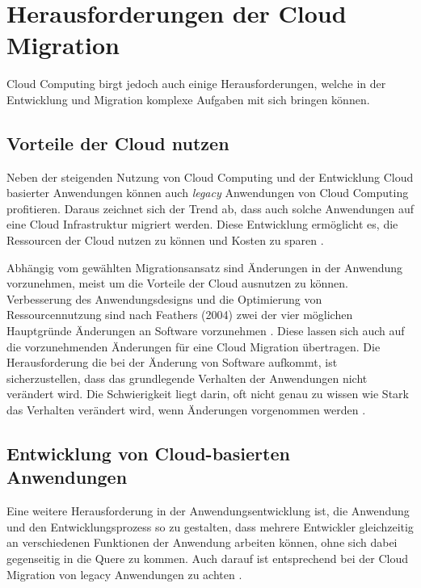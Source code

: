 \section{Herausforderungen der Cloud Migration}
\label{sec:herausforderungen}


Cloud Computing birgt jedoch auch einige Herausforderungen, welche in der Entwicklung und Migration komplexe Aufgaben mit sich bringen können.

\subsection{Vorteile der Cloud nutzen}

Neben der steigenden Nutzung von Cloud Computing und der Entwicklung Cloud basierter Anwendungen können auch \textit{legacy} Anwendungen von Cloud Computing profitieren. Daraus zeichnet sich der Trend ab, dass auch solche Anwendungen auf eine Cloud Infrastruktur migriert werden. Diese Entwicklung ermöglicht es, die Ressourcen der Cloud nutzen zu können und Kosten zu sparen \cite[Vgl.][S. 31]{Maenhaut2016}.

Abhängig vom gewählten Migrationsansatz sind Änderungen in der Anwendung vorzunehmen, meist um die Vorteile der Cloud ausnutzen zu können. Verbesserung des Anwendungsdesigns und die Optimierung von Ressourcennutzung sind nach Feathers (2004) zwei der vier möglichen Hauptgründe Änderungen an Software vorzunehmen \cite[Vgl.][S. 3]{Feathers2004}. Diese lassen sich auch auf die vorzunehmenden Änderungen für eine Cloud Migration übertragen. Die Herausforderung die bei der Änderung von Software aufkommt, ist sicherzustellen, dass das grundlegende Verhalten der Anwendungen nicht verändert wird. Die Schwierigkeit liegt darin, oft nicht genau zu wissen wie Stark das Verhalten verändert wird, wenn Änderungen vorgenommen werden \cite[Vgl.][S. 7]{Feathers2004}. 

\subsection{Entwicklung von Cloud-basierten Anwendungen}

Eine weitere Herausforderung in der Anwendungsentwicklung ist, die Anwendung und den Entwicklungsprozess so zu gestalten, dass mehrere Entwickler gleichzeitig an verschiedenen Funktionen der Anwendung arbeiten können, ohne sich dabei gegenseitig in die Quere zu kommen. Auch darauf ist entsprechend bei der Cloud Migration von legacy Anwendungen zu achten \cite[Vgl.][]{Ibryam2021}.

